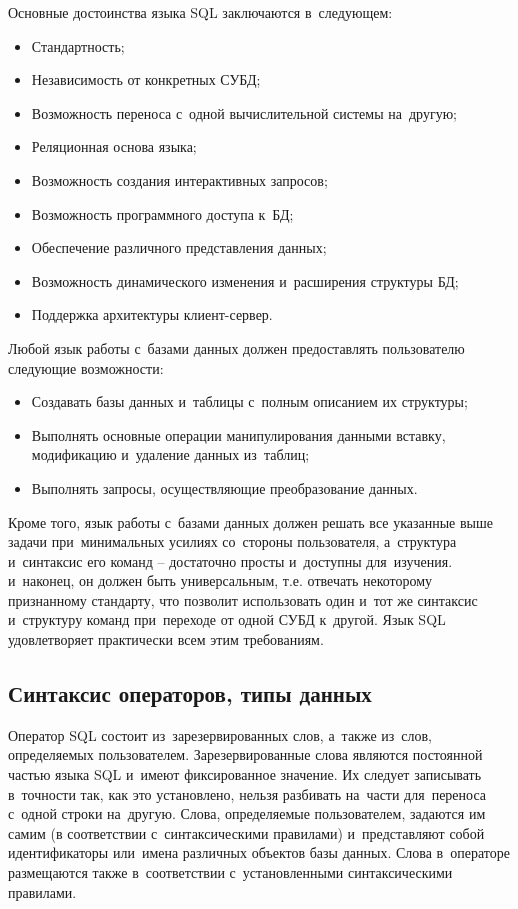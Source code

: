 \documentclass{ou}
\begin{document}
Основные достоинства языка SQL заключаются в~следующем:

\begin{itemize}[label=-, itemindent=4em, nosep]
\item Стандартность;
\item Независимость от конкретных СУБД;
\item Возможность переноса с~одной вычислительной системы на~другую;
\item Реляционная основа языка;
\item Возможность создания интерактивных запросов;
\item Возможность программного доступа к~БД;
\item Обеспечение различного представления данных;
\item Возможность динамического изменения и~расширения структуры БД;
\item Поддержка архитектуры клиент-сервер.
\end{itemize}

Любой язык работы с~базами данных должен предоставлять пользователю следующие возможности:

\begin{itemize}[label=-, itemindent=4em, nosep]
\item Создавать базы данных и~таблицы с~полным описанием их структуры;
\item Выполнять основные операции манипулирования данными вставку, модификацию и~удаление данных из~таблиц;
\item Выполнять запросы, осуществляющие преобразование данных.
\end{itemize}

 
Кроме того, язык работы с~базами данных должен решать все указанные выше задачи при~минимальных усилиях со~стороны пользователя, а~структура и~синтаксис его команд -- достаточно просты и~доступны для~изучения. и~наконец, он должен быть универсальным, т.е. отвечать некоторому признанному стандарту, что позволит использовать один и~тот же синтаксис и~структуру команд при~переходе от одной СУБД к~другой. Язык SQL удовлетворяет практически всем этим требованиям. 

\subsection{Синтаксис операторов, типы данных} 
Оператор SQL состоит из~зарезервированных слов, а~также из~слов, определяемых пользователем. Зарезервированные слова являются постоянной частью языка SQL и~имеют фиксированное значение. Их следует записывать в~точности так, как это установлено, нельзя разбивать на~части для~переноса с~одной строки на~другую. Слова, определяемые пользователем, задаются им самим (в соответствии с~синтаксическими правилами) и~представляют собой идентификаторы или~имена различных объектов базы данных. Слова в~операторе размещаются также в~соответствии с~установленными синтаксическими правилами. 
\end{document}

